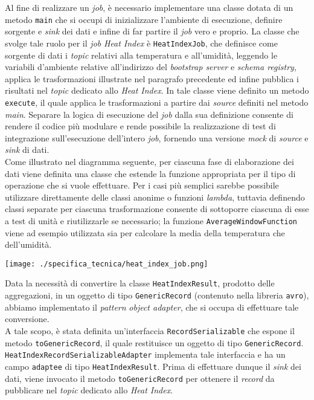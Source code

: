 Al fine di realizzare un \textit{job}, è necessario implementare una classe dotata di un metodo \texttt{main} che si occupi di inizializzare l'ambiente di esecuzione, definire
sorgente e \textit{sink} dei dati e infine di far partire il \textit{job} vero e proprio.
La classe che svolge tale ruolo per il \textit{job} \textit{Heat Index} è \texttt{HeatIndexJob}, che definisce come sorgente di dati
i \textit{topic} relativi alla temperatura e all'umidità, leggendo le variabili d'ambiente relative all'indirizzo del \textit{bootstrap server} e \textit{schema registry},
applica le trasformazioni illustrate nel paragrafo precedente ed infine pubblica i risultati nel \textit{topic} dedicato allo \textit{Heat Index}.
In tale classe viene definito un metodo \texttt{execute}, il quale applica le trasformazioni a partire dai \textit{source} definiti nel metodo \textit{main}. Separare
la logica di esecuzione del \textit{job} dalla sua definizione consente di rendere il codice più modulare e rende possibile la realizzazione di test di integrazione sull'esecuzione
dell'intero \textit{job}, fornendo una versione \textit{mock} di \textit{source} e \textit{sink} di dati.\\
Come illustrato nel diagramma seguente, per ciascuna fase di elaborazione dei dati viene definita una classe che estende la funzione appropriata per il tipo di operazione che si
vuole effettuare. Per i casi più semplici sarebbe possibile utilizzare direttamente delle classi anonime o funzioni \textit{lambda}, tuttavia definendo classi separate
per ciascuna trasformazione consente di sottoporre ciascuna di esse a test di unità e riutilizzarle se necessario; la funzione \texttt{AverageWindowFunction} viene ad esempio
utilizzata sia per calcolare la media della temperatura che dell'umidità.

\begin{center}
	\texttt{[image: ./specifica\_tecnica/heat\_index\_job.png]}
\end{center}

\label{object_adapter}
Data la necessità di convertire la classe \texttt{HeatIndexResult}, prodotto delle aggregazioni, in un oggetto di tipo \texttt{GenericRecord} (contenuto nella libreria \texttt{avro}),
abbiamo implementato il \textit{pattern} \textit{object adapter}, che si occupa di effettuare tale conversione.\\
A tale scopo, è stata definita un'interfaccia \texttt{RecordSerializable} che espone il metodo \texttt{toGenericRecord}, il quale restituisce un oggetto di tipo \texttt{GenericRecord}.\\
\texttt{HeatIndexRecordSerializableAdapter} implementa tale interfaccia e ha un campo \texttt{adaptee} di tipo \texttt{HeatIndexResult}. Prima di effettuare dunque il \textit{sink}
dei dati, viene invocato il metodo \texttt{toGenericRecord} per ottenere il \textit{record} da pubblicare nel \textit{topic} dedicato allo \textit{Heat Index}.


